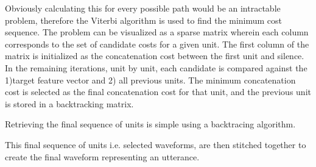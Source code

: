 \documentclass[10pt, journal, compsoc]{IEEEtran}
\begin{document}
\cite{Hunt:1996:USC:1256383.1256532}\par
Obviously calculating this for every possible path would be an intractable problem, therefore the Viterbi algorithm is used to find the minimum cost sequence. The problem can be visualized as a sparse matrix wherein each column corresponds to the set of candidate costs for a given unit. The first column of the matrix is initialized as the concatenation cost between the first unit and silence. In the remaining iterations, unit by unit, each candidate is compared against the 1)target feature vector and 2) all previous units. The minimum concatenation cost is selected as the final concatenation cost for that unit, and the previous unit is stored in a backtracking matrix.
\begin{algorithm}
\begin{algorithmic}[1]
\EndFor
{}
     \EndFor
\EndFor
{}
\EndFunction
\end{algorithmic}
\end{algorithm}
Retrieving the final sequence of units is simple using a backtracing algorithm.
\begin{algorithm}
\begin{algorithmic}[1]
\EndFor
{}
\EndFunction
\end{algorithmic}
\end{algorithm}
This final sequence of units i.e. selected waveforms, are then stitched together to create the final waveform representing an utterance.
\end{document}
